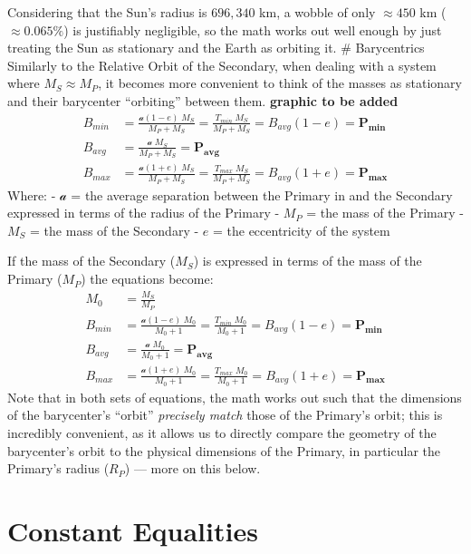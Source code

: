 \documentclass[
  letterpaper,
]{book}
\begin{document}
Considering that the Sun's radius is \(696{,}340\) km, a wobble of only
\(≈ 450\) km (\(\approx 0.065\%\)) is justifiably negligible, so the
math works out well enough by just treating the Sun as stationary and
the Earth as orbiting it. \# Barycentrics Similarly to the Relative
Orbit of the Secondary, when dealing with a system where \(M_S ≈ M_P\),
it becomes more convenient to think of the masses as stationary and
their barycenter ``orbiting'' between them. \textbf{\textbar graphic to
be added\textbar{}} \[
\begin{align}
B_{min} &=   \frac{\mathcal{a}(1 - e)\; M_S}{M_P + M_S} 
= \frac{T_{min}\; M_S}{M_P + M_S} = B_{avg}(1 - e) = \mathbf{P_{min}} \\[2em]
B_{avg} &= \frac{\mathcal{a}\; M_S}{M_P + M_S} = \mathbf{P_{avg}} \\[2em]
B_{max} &= \frac{\mathcal{a}(1 + e)\; M_S}{M_P + M_S} 
= \frac{T_{max}\; M_S}{M_P + M_S} = B_{avg}(1 + e) = \mathbf{P_{max}}
\end{align}
\] Where: - \(\mathcal{a}\) = the average separation between the Primary
in and the Secondary expressed in terms of the radius of the Primary -
\(M_P\) = the mass of the Primary - \(M_S\) = the mass of the Secondary
- \(e\) = the eccentricity of the system

If the mass of the Secondary (\(M_S\)) is expressed in terms of the mass
of the Primary (\(M_P\)) the equations become: \[
\begin{align}
M_0 &= \frac{M_S}{M_P} \\[1em]
B_{min} &= \frac{\mathcal{a}(1 - e)\; M_0}{M_0 + 1} 
= \frac{T_{min}\; M_0}{M_0 + 1} = B_{avg}(1 - e) = \mathbf{P_{min}} \\[2em]
B_{avg} &= \frac{\mathcal{a}\; M_0}{M_0 + 1} = \mathbf{P_{avg}} \\[2em]
B_{max} &= \frac{\mathcal{a}(1 + e)\; M_0}{M_0 + 1} 
= \frac{T_{max}\; M_0}{M_0 + 1} = B_{avg}(1 + e) = \mathbf{P_{max}}
\end{align}
\] Note that in both sets of equations, the math works out such that the
dimensions of the barycenter's ``orbit'' \emph{precisely match} those of
the Primary's orbit; this is incredibly convenient, as it allows us to
directly compare the geometry of the barycenter's orbit to the physical
dimensions of the Primary, in particular the Primary's radius (\(R_P\))
--- more on this below.

\chapter{Constant Equalities}\label{constant-equalities}
\end{document}

